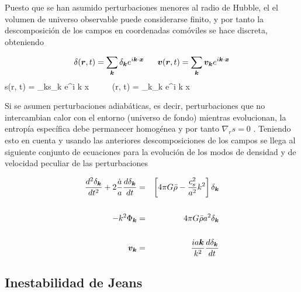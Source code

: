 Puesto que se han asumido perturbaciones menores al radio de Hubble, el
el volumen de universo observable puede considerarse finito, y por tanto la 
descomposición de los campos en coordenadas comóviles se hace discreta, 
obteniendo


\[  \delta(\bds r, t) =  \sum_{\bds k}\delta_{\bds k} e^{i \bds k \cdot \bds x} 
\ \ \ \ \ 
	\bds v(\bds r, t) =  \sum_{\bds k}\bds v_{\bds k} e^{i \bds k \cdot \bds x}\]
\eq{eq:FourierFields}
{  s(\bds r, t) =  \sum_{\bds k}s_{\bds k} e^{i \bds k \cdot \bds x} 
\ \ \ \ \ 
	\Phi(\bds r, t) =  \sum_{\bds k}\Phi_{\bds k} e^{i \bds k \cdot \bds x}}


Si se asumen perturbaciones adiabáticas, es decir, perturbaciones que no 
intercambian calor con el entorno (universo de fondo) mientras evolucionan,
la entropía específica debe permanecer homogénea y por tanto $\nabla_r s = 0$
\cite{longair2008}. Teniendo esto en cuenta y usando las anteriores 
descomposiciones de los campos se llega al siguiente conjunto de ecuaciones
para la evolución de los modos de densidad y de velocidad peculiar de las 
perturbaciones


\begin{eqnarray}
\label{eq:ContinuityEquationCMode}
\frac{ d ^2 \delta_{\boldsymbol{ k }} }{d t^2} + 2\frac{\dot a}{a}\frac{ d \delta_{\boldsymbol{ k }} }{d t} &=& 
\left[  4\pi G \bar \rho - \frac{c_s^2}{a^2}k^2  \right]\delta_{\boldsymbol{ k }}\\
\nonumber{}
\\
\label{eq:EulerEquationCMode}
- k^2 \Phi_{\boldsymbol{ k }} &=& 4\pi G \bar \rho a^2 \delta_{\boldsymbol{ k }}\\
\nonumber{}
\\
\label{eq:PoissonEquationCMode}
\boldsymbol{ v }_{\boldsymbol{ k }} &=& \frac{i a \boldsymbol{ k }}{k^2}\frac{ d \delta_{\boldsymbol{ k }} }{d t}
\end{eqnarray}


	\subsection{Inestabilidad de Jeans}
	\label{subsec:JeansInstability}
	
